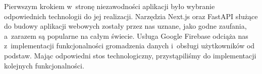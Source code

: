 Pierwszym krokiem w~stronę niezawodności aplikacji było wybranie
odpowiednich technologii do jej realizacji. Narzędzia Next.js
oraz FastAPI służące do budowy aplikacji webowych zostały
przez nas uznane, jako godne zaufania, a~zarazem są
popularne na całym świecie. Usługa Google Firebase odciąża nas z~implementacji
funkcjonalności gromadzenia danych i~obsługi użytkowników od podstaw.
Mając odpowiedni stos technologiczny, przystąpiliśmy do implementacji
kolejnych funkcjonalności.
